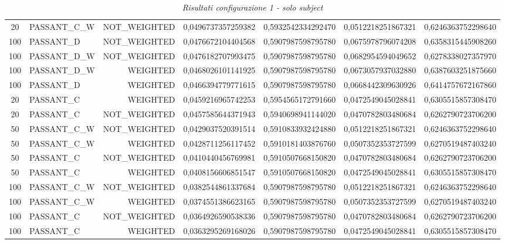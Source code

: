 \begin{table}[H]
{\begin{tabular}{ c l r c c c c }
	20 & PASSANT\_C\_W & NOT\_WEIGHTED & 0,0496737357259382 & 0,5932542334292470 & 0,0512218251867321 & 0,6246363752298640 \\
	
	100 &  PASSANT\_D & NOT\_WEIGHTED & 0,0476672104404568 & 0,5907987598795780 & 0,0675978796074208 & 0,6358315445908260 \\
	
	100 & PASSANT\_D\_W & NOT\_WEIGHTED & 0,0476182707993475 & 0,5907987598795780 & 0,0682954594049652 & 0,6278338027357970 \\
	
	100 & PASSANT\_D\_W &   WEIGHTED & 0,0468026101141925 & 0,5907987598795780 & 0,0673057937032880 & 0,6387603251875660 \\
	
	100 &  PASSANT\_D &   WEIGHTED & 0,0466394779771615 & 0,5907987598795780 & 0,0668442309630926 & 0,6414757672167860 \\
	
	20 &  PASSANT\_C &   WEIGHTED & 0,0459216965742253 & 0,5954565172791660 & 0,0472549045028841 & 0,6305515857308470 \\
	
	20 &  PASSANT\_C & NOT\_WEIGHTED & 0,0457585644371943 & 0,5940698941144020 & 0,0470782803480684 & 0,6262790723706200 \\
	
	50 & PASSANT\_C\_W & NOT\_WEIGHTED & 0,0429037520391514 & 0,5910833932424880 & 0,0512218251867321 & 0,6246363752298640 \\
	
	50 & PASSANT\_C\_W &   WEIGHTED & 0,0428711256117452 & 0,5910181403876760 & 0,0507352353727599 & 0,6270519487403240 \\
	
	50 &  PASSANT\_C & NOT\_WEIGHTED & 0,0410440456769981 & 0,5910507668150820 & 0,0470782803480684 & 0,6262790723706200 \\
	
	50 &  PASSANT\_C &   WEIGHTED & 0,0408156606851547 & 0,5910507668150820 & 0,0472549045028841 & 0,6305515857308470 \\
	
	100 & PASSANT\_C\_W & NOT\_WEIGHTED & 0,0382544861337684 & 0,5907987598795780 & 0,0512218251867321 & 0,6246363752298640 \\
	
	100 & PASSANT\_C\_W &   WEIGHTED & 0,0374551386623165 & 0,5907987598795780 & 0,0507352353727599 & 0,6270519487403240 \\
	
	100 &  PASSANT\_C & NOT\_WEIGHTED & 0,0364926590538336 & 0,5907987598795780 & 0,0470782803480684 & 0,6262790723706200 \\
	
	100 &  PASSANT\_C &   WEIGHTED & 0,0363295269168026 & 0,5907987598795780 & 0,0472549045028841 & 0,6305515857308470 \\
	\bottomrule
\end{tabular}  
}
\caption{\emph{Risultati configurazione 1 - solo subject}}
\end{table} 

